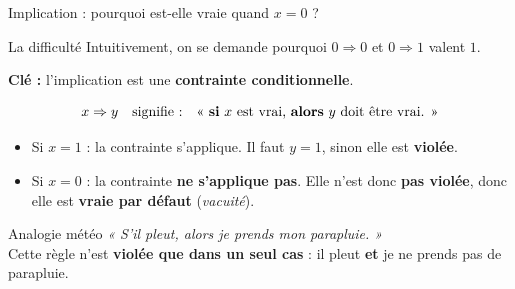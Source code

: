 \begin{frame}{Implication : pourquoi est-elle vraie quand \(x = 0\) ?}

    \begin{alertblock}{La difficulté}
        Intuitivement, on se demande pourquoi \(0 \Rightarrow 0\) et \(0 \Rightarrow 1\) valent \(1\).
    \end{alertblock}

    \vspace{0.3cm}

    \textbf{Clé :} l'implication est une \textbf{contrainte conditionnelle}.

    \vspace{0.2cm}

    \[
        x \Rightarrow y \quad \text{signifie :} \quad \text{« \textbf{si} } x \text{ est vrai, \textbf{alors} } y \text{ doit être vrai. »}
    \]

    \vspace{0.3cm}

    \begin{itemize}
        \item Si \(x = 1\) : la contrainte s'applique. Il faut \(y = 1\), sinon elle est \textbf{violée}.
        \item Si \(x = 0\) : la contrainte \textbf{ne s'applique pas}. Elle n'est donc \textbf{pas violée}, donc elle est \textbf{vraie par défaut} (\textit{vacuité}).
    \end{itemize}

    \vspace{0.4cm}

    \begin{exampleblock}{Analogie météo}
        \textit{« S'il pleut, alors je prends mon parapluie. »}\\[0.2cm]
        Cette règle n'est \textbf{violée que dans un seul cas} : il pleut \textbf{et} je ne prends pas de parapluie.
    \end{exampleblock}

\end{frame}

